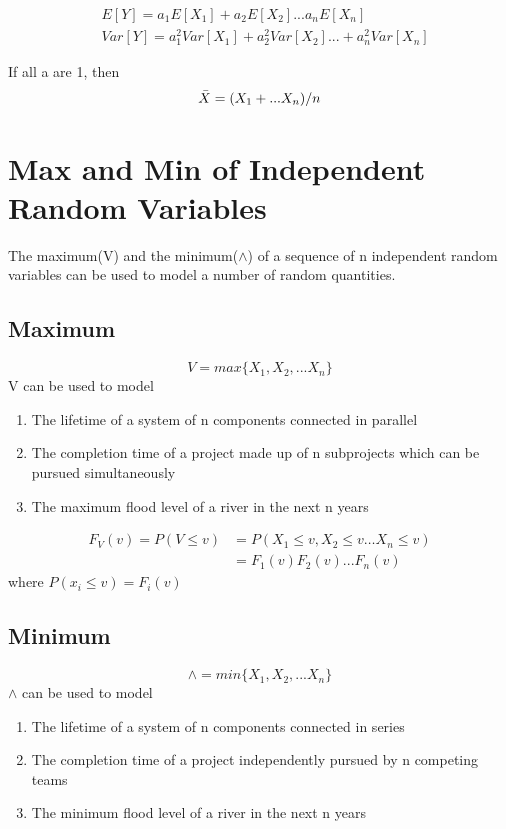 \documentclass{article}
\begin{document}
    \begin{align*}
       &E[Y] = a_{1}E[X_{1}] + a_{2}E[X_{2}]...a_{n}E[X_{n}]\\
       &Var[Y] = a_{1}^{2}Var[X_{1}] + a_{2}^{2}Var[X_{2}]...+ a_{n}^{2}Var[X_{n}]
    \end{align*}

    If all a are 1, then 
    \begin{equation*}
        \bar{X} = (X_{1} + ... X_{n}) / n\\
    \end{equation*}

    \section*{Max and Min of Independent Random Variables}
    The maximum(V) and the minimum($\wedge$) of a sequence of n independent random variables can be used to 
    model a number of random quantities.

    \subsection*{Maximum}
    \begin{equation*}
        V = max\{X_{1}, X_{2},...X_{n}\}
    \end{equation*}
    V can be used to model
    \begin{enumerate}
        \item The lifetime of a system of n components connected in parallel
        \item The completion time of a project made up of n subprojects which can be pursued simultaneously
        \item The maximum flood level of a river in the next n years
    \end{enumerate}

    \begin{align*}
        F_{V}(v) = P(V \leq v) &= P(X_{1}\leq v, X_{2} \leq v \dots X_{n} \leq v )\\
        &= F_{1}(v)F_{2}(v)...F_{n}(v)
    \end{align*}
        where $P(x_{i}\leq v)  = F_{i}(v)$
    
    \subsection*{Minimum}
    \begin{equation*}
        \wedge = min\{X_{1}, X_{2},...X_{n}\}
    \end{equation*}
    $\wedge$ can be used to model
    \begin{enumerate}
        \item The lifetime of a system of n components connected in series
        \item The completion time of a project independently pursued by n competing teams
        \item The minimum flood level of a river in the next n years
    \end{enumerate}
\end{document}
